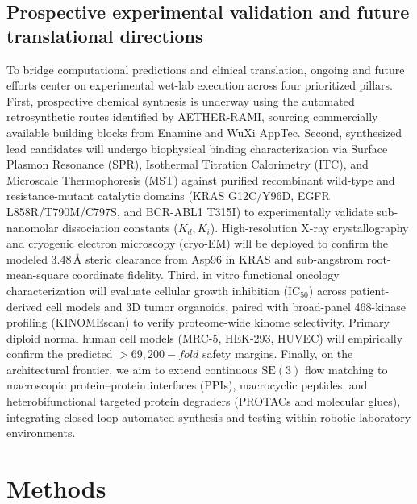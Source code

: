\documentclass[11pt,a4paper]{article}
\begin{document}
\subsection*{Prospective experimental validation and future translational directions}
To bridge computational predictions and clinical translation, ongoing and future efforts center on experimental wet-lab execution across four prioritized pillars. First, prospective chemical synthesis is underway using the automated retrosynthetic routes identified by AETHER-RAMI, sourcing commercially available building blocks from Enamine and WuXi AppTec. Second, synthesized lead candidates will undergo biophysical binding characterization via Surface Plasmon Resonance (SPR), Isothermal Titration Calorimetry (ITC), and Microscale Thermophoresis (MST) against purified recombinant wild-type and resistance-mutant catalytic domains (KRAS G12C/Y96D, EGFR L858R/T790M/C797S, and BCR-ABL1 T315I) to experimentally validate sub-nanomolar dissociation constants ($K_d, K_i$). High-resolution X-ray crystallography and cryogenic electron microscopy (cryo-EM) will be deployed to confirm the modeled 3.48\,{\AA} steric clearance from Asp96 in KRAS and sub-angstrom root-mean-square coordinate fidelity. Third, in vitro functional oncology characterization will evaluate cellular growth inhibition ($\text{IC}_{50}$) across patient-derived cell models and 3D tumor organoids, paired with broad-panel 468-kinase profiling (KINOMEscan) to verify proteome-wide kinome selectivity. Primary diploid normal human cell models (MRC-5, HEK-293, HUVEC) will empirically confirm the predicted $>69,200-fold$ safety margins. Finally, on the architectural frontier, we aim to extend continuous $\mathrm{SE}(3)$ flow matching to macroscopic protein--protein interfaces (PPIs), macrocyclic peptides, and heterobifunctional targeted protein degraders (PROTACs and molecular glues), integrating closed-loop automated synthesis and testing within robotic laboratory environments.



\section*{Methods}

\end{document}
